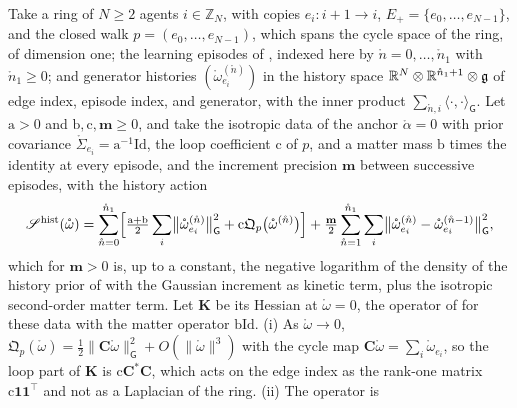 Take a ring of \(N\geq2\) agents \(i\in\mathbb Z_N\), with copies \(e_i:i+1\to i\),
\(E_+=\{e_0,\ldots,e_{N-1}\}\), and the closed walk \(p=(e_0,\ldots,e_{N-1})\), which spans the cycle
space of the ring, of dimension one; the learning episodes of ,
indexed here by \(\mathring n=0,\ldots,\mathring n_1\) with \(\mathring n_1\geq0\); and generator histories
\((\mathring\omega^{(\mathring n)}_{e_i})\) in the history space
\(\mathbb R^N\otimes\mathbb R^{\mathring n_1+1}\otimes\mathfrak g\) of edge index, episode index, and generator, with the
inner product \(\sum_{\mathring n,i}\langle\cdot,\cdot\rangle_{\mathsf G}\). Let \(\mathrm a>0\) and
\(\mathrm b,\mathrm c,\mathbf m\geq0\), and take the isotropic data of the anchor \(\mathring\alpha=0\) with prior
covariance \(\mathring\Sigma_{e_i}=\mathrm a^{-1}\mathrm{Id}\), the loop coefficient \(\mathrm c\) of \(p\), and a
matter mass \(\mathrm b\) times the identity at every episode, and the increment precision \(\mathbf m\)
between successive episodes, with the history action
\begin{equation}
\mathscr S^{\mathrm{hist}}(\mathring\omega)
=\sum_{\mathring n=0}^{\mathring n_1}\Bigl[\tfrac{\mathrm a+\mathrm b}2\sum_i\bigl\lVert\mathring\omega^{(\mathring n)}_{e_i}\bigr\rVert_{\mathsf G}^2
+\mathrm c\mathfrak Q_p\bigl(\mathring\omega^{(\mathring n)}\bigr)\Bigr]
+\tfrac{\mathbf m}2\sum_{\mathring n=1}^{\mathring n_1}\sum_i\bigl\lVert\mathring\omega^{(\mathring n)}_{e_i}-\mathring\omega^{(\mathring n-1)}_{e_i}\bigr\rVert_{\mathsf G}^2 ,
\label{eq:glink-ring-energy}
\end{equation}
which for \(\mathbf m>0\) is, up to a constant, the negative logarithm of the density of the history
prior of  with the Gaussian increment as kinetic term, plus the isotropic
second-order matter term. Let \(\mathbf K\) be its Hessian at \(\mathring\omega=0\), the operator of
 for these data with the matter operator \(\mathrm b\mathrm{Id}\).
(i) As \(\mathring\omega\to0\),
\(\mathfrak Q_p(\mathring\omega)=\tfrac12\lVert\mathbf C\mathring\omega\rVert_{\mathsf G}^2+O(\lVert\mathring\omega\rVert^3)\)
with the cycle map \(\mathbf C\mathring\omega=\sum_i\mathring\omega_{e_i}\), so the loop part of \(\mathbf K\)
is \(\mathrm c\mathbf C^*\mathbf C\), which acts on the edge index as the rank-one matrix
\(\mathrm c\mathbf 1\mathbf 1^\top\) and not as a Laplacian of the ring. (ii) The operator is
